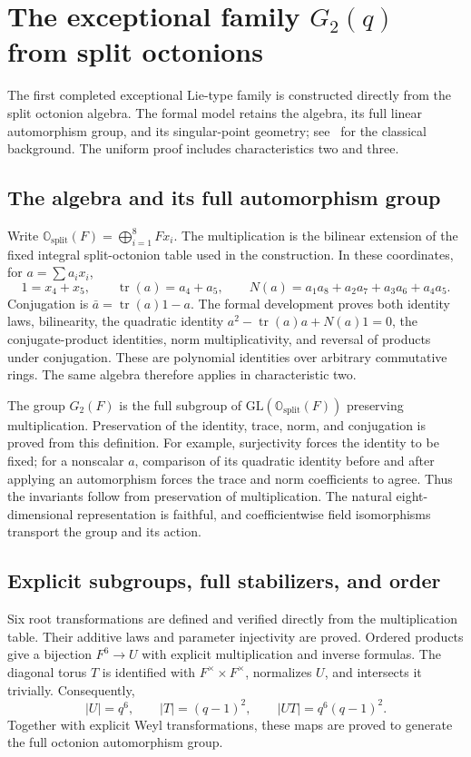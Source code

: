 \documentclass[11pt]{article}
\numberwithin{equation}{section}
\theoremstyle{definition}
\newcommand{\GL}{\mathrm{GL}}
\begin{document}
\section{The exceptional family \texorpdfstring{$G_2(q)$}{G2(q)} from split octonions}\label{sec:g2}

The first completed exceptional Lie-type family is constructed directly
from the split octonion algebra. The formal model retains the algebra,
its full linear automorphism group, and its singular-point geometry;
see~\cite[Chapter~4]{Wilson} for the classical background.
The uniform proof includes characteristics two and three.

\subsection{The algebra and its full automorphism group}

Write $\mathbb O_{\mathrm{split}}(F)=\bigoplus_{i=1}^{8}F x_i$.
The multiplication is the bilinear extension of the fixed integral
split-octonion table used in the construction. In these coordinates,
for $a=\sum a_i x_i$,
\[
 1=x_4+x_5,\qquad \operatorname{tr}(a)=a_4+a_5,\qquad
 N(a)=a_1a_8+a_2a_7+a_3a_6+a_4a_5.
\]
Conjugation is $\bar a=\operatorname{tr}(a)1-a$. The formal development
proves both identity laws, bilinearity, the quadratic identity
$a^2-\operatorname{tr}(a)a+N(a)1=0$, the conjugate-product identities,
norm multiplicativity, and reversal of products under conjugation.
These are polynomial identities over arbitrary commutative rings.
The same algebra therefore applies in characteristic two.

The group $G_2(F)$ is the full subgroup of $\GL(\mathbb O_{\mathrm{split}}(F))$
preserving multiplication. Preservation of the identity, trace, norm,
and conjugation is proved from this definition. For example,
surjectivity forces the identity to be fixed; for a nonscalar $a$,
comparison of its quadratic identity before and after applying an
automorphism forces the trace and norm coefficients to agree.
Thus the invariants follow from preservation of multiplication. The natural eight-dimensional representation
is faithful, and coefficientwise field isomorphisms transport the
group and its action.

\subsection{Explicit subgroups, full stabilizers, and order}

Six root transformations are defined and verified directly from the
multiplication table. Their additive laws and parameter injectivity
are proved. Ordered products give a bijection $F^6\longrightarrow U$
with explicit multiplication and inverse formulas. The diagonal torus
$T$ is identified with $F^{\times}\times F^{\times}$, normalizes $U$,
and intersects it trivially. Consequently,
\[
 |U|=q^6,\qquad |T|=(q-1)^2,\qquad |UT|=q^6(q-1)^2.
\]
Together with explicit Weyl transformations, these maps are proved
to generate the full octonion automorphism group.
\end{document}
